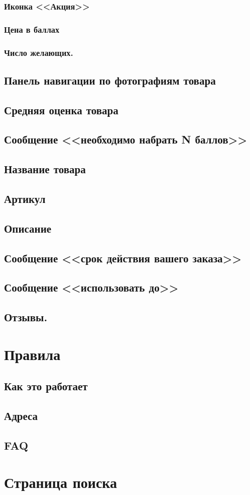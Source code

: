             \subsubsection{Иконка <<Акция>>}
            \subsubsection{Цена в баллах}
            \subsubsection{Число желающих.}

        \subsection{Панель навигации по фотографиям товара}
        \subsection{Средняя оценка товара}
        \subsection{Сообщение <<необходимо набрать N баллов>>}
        \subsection{Название товара}
        \subsection{Артикул}
        \subsection{Описание}
        \subsection{Сообщение <<срок действия вашего заказа>>}
        \subsection{Сообщение <<использовать до>>}
        \subsection{Отзывы.}

    \section{Правила}
        \subsection{Как это работает}
            \label{sec:rules_hiw}
        \subsection{Адреса}
        \subsection{FAQ}
            \label{page_faq}

    \section{Страница поиска}
        \label{search_page}
